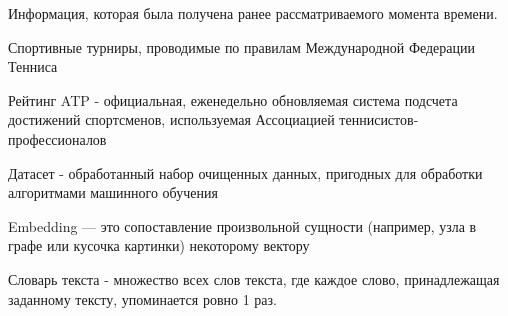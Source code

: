 \Defines %
\begin{description}
	
	\item[Априорная информация]  Информация, которая была получена ранее рассматриваемого момента времени\cite{def01}.
	\item[Теннис] Спортивные турниры, проводимые по правилам Международной Федерации Тенниса\cite{Book04}
	\item Рейтинг ATP -  официальная, еженедельно обновляемая система подсчета достижений спортсменов, используемая Ассоциацией теннисистов-профессионалов\cite{def02}
	\item Датасет - обработанный набор очищенных данных, пригодных для обработки алгоритмами машинного обучения\cite{def03}
	\item Embedding — это сопоставление произвольной сущности (например, узла в графе или кусочка картинки) некоторому вектору\cite{Book27}
	\item Словарь текста - множество всех слов текста, где каждое слово, принадлежащая заданному тексту, упоминается ровно 1 раз.
	
	
\end{description}

